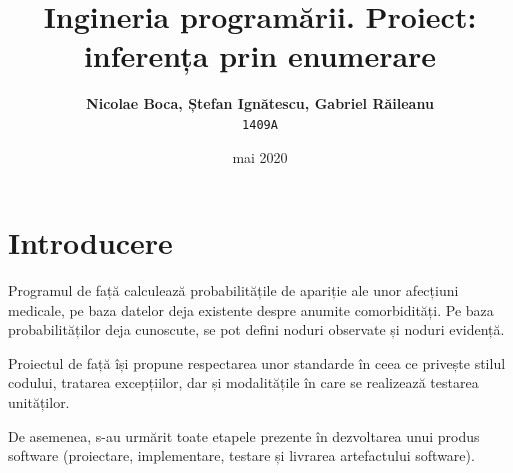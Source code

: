 \documentclass[12pt]{article}
\title{Ingineria programării. Proiect: inferența prin enumerare} %
\author{\textbf{Nicolae Boca, Ștefan Ignătescu, Gabriel Răileanu}\\ \texttt{1409A}}
\date{mai 2020}
\begin{document}
\maketitle

\section{Introducere}
Programul de față calculează probabilitățile de apariție ale unor afecțiuni medicale, pe baza datelor deja existente despre anumite comorbidități. Pe baza probabilităților deja cunoscute, se pot defini noduri observate și noduri evidență.
\par
Proiectul de față își propune respectarea unor standarde în ceea ce privește stilul codului, tratarea excepțiilor, dar și modalitățile în care se realizează testarea unităților.
\par
De asemenea, s-au urmărit toate etapele prezente în dezvoltarea unui produs software (proiectare, implementare, testare și livrarea artefactului software).
\end{document}
